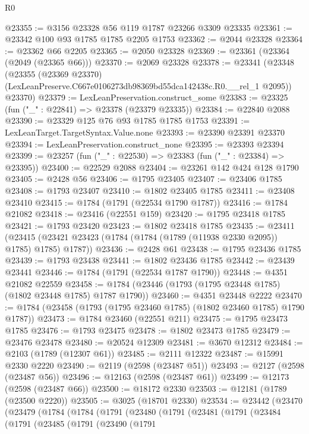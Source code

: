 \begin{lexlean}{R0}
\begin{coremodule}
@23355 := @3156 @23328 @56 @119 @1787 @23266 @3309 @23335
@23361 := @23342 @100 @93 @1785 @1785 @2205 @1753
@23362 := @2044 @23328
@23364 := @23362 @66 @2205
@23365 := @2050 @23328
@23369 := @23361 (@23364 (@2049 (@23365 @66)))
@23370 := @2069 @23328
@23378 := @23341
    (@23348
      (@23355 (@23369 @23370) (LexLeanPreserve.C667e0106273db98369bd55dca142438c.R0.__rel_1 @2095))
      @23370)
@23379 := LexLeanPreservation.construct_some
@23383 := @23325 (fun ("_" : @22841) => @23378 (@23379 @23335))
@23384 := @22840 @2088
@23390 := @23329 @125 @76 @93 @1785 @1785 @1753
@23391 := LexLeanTarget.TargetSyntax.Value.none
@23393 := @23390 @23391 @23370
@23394 := LexLeanPreservation.construct_none
@23395 := @23393 @23394
@23399 := @23257 (fun ("_" : @22530) => @23383 (fun ("_" : @23384) => @23395))
@23400 := @22529 @2088
@23404 := @23261 @142 @424 @128 @1790
@23405 := @2428 @56
@23406 := @1795 @23405
@23407 := @23406 @1785
@23408 := @1793 @23407
@23410 := @1802 @23405 @1785
@23411 := @23408 @23410
@23415 := @1784 (@1791 (@22534 @1790 @1787))
@23416 := @1784 @21082
@23418 := @23416 (@22551 @159)
@23420 := @1795 @23418 @1785
@23421 := @1793 @23420
@23423 := @1802 @23418 @1785
@23435 := @23411
    (@23415 (@23421 @23423 (@1784 (@1784 (@1789 (@11938 @2330 @2095)) @1785) @1785) @1787))
@23436 := @2428 @61
@23438 := @1795 @23436 @1785
@23439 := @1793 @23438
@23441 := @1802 @23436 @1785
@23442 := @23439 @23441
@23446 := @1784 (@1791 (@22534 @1787 @1790))
@23448 := @4351 @21082 @22559
@23458 := @1784 (@23446 (@1793 (@1795 @23448 @1785) (@1802 @23448 @1785) @1787 @1790))
@23460 := @4351 @23448 @2222
@23470 := @1784 (@23458 (@1793 (@1795 @23460 @1785) (@1802 @23460 @1785) @1790 @1787))
@23473 := @1784 @23460 (@22551 @211)
@23475 := @1795 @23473 @1785
@23476 := @1793 @23475
@23478 := @1802 @23473 @1785
@23479 := @23476 @23478
@23480 := @20524 @12309
@23481 := @3670 @12312
@23484 := @2103 (@1789 (@12307 @61))
@23485 := @2111 @12322
@23487 := @15991 @2330 @2220
@23490 := @2119 (@2598 (@23487 @51))
@23493 := @2127 (@2598 (@23487 @56))
@23496 := @12163 (@2598 (@23487 @61))
@23499 := @12173 (@2598 (@23487 @66))
@23500 := @18172 @2330
@23503 := @12181 (@1789 (@23500 @2220))
@23505 := @3025 (@18701 @2330)
@23534 := @23442
    (@23470
      (@23479
        (@1784
          (@1784
            (@1791
              (@23480
                (@1791
                  (@23481
                    (@1791
                      (@23484
                        (@1791
                          (@23485
                            (@1791
                              (@23490
                                (@1791

\end{coremodule}
\end{lexlean}
